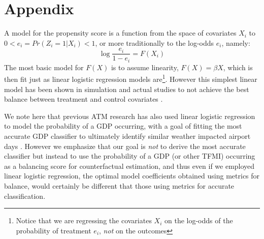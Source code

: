 \documentclass[conference]{IEEEtran}
\begin{document}
%
%

\section{Appendix}
A model for the propensity score is a function from the space of covariates $X_i$ to $0<e_i=Pr(Z_i=1|X_i)<1$, or more traditionally to the log-odds $e_i$, namely:  
\begin{equation}
\log\frac{e_i}{1-e_i}=F(X_i)
\end{equation}
The most basic model for $F(X)$ is to assume linearity, $F(X)=\beta X$, which is then fit just as linear logistic regression models are\footnote{Notice that we are regressing the covariates $X_i$ on the log-odds of the probability of treatment $e_i$, \emph{not} on the outcomes}. However this simplest linear model has been shown in simulation and actual studies to not achieve the best balance between treatment and control covariates .  

We note here that previous ATM research has also used linear logistic regression to model the probability of a GDP occurring, with a goal of fitting the most accurate GDP classifier to ultimately identify similar weather impacted airport days \cite{Grabbe:2014aa}.  However we emphasize that our goal is \emph{not} to derive the most accurate classifier but instead to use the probability of a GDP (or other TFMI) occurring as a balancing score for counterfactual estimation, and thus even if we employed linear logistic regression, the optimal model coefficients obtained using metrics for balance, would certainly be different that those using metrics for accurate classification.
\end{document}

